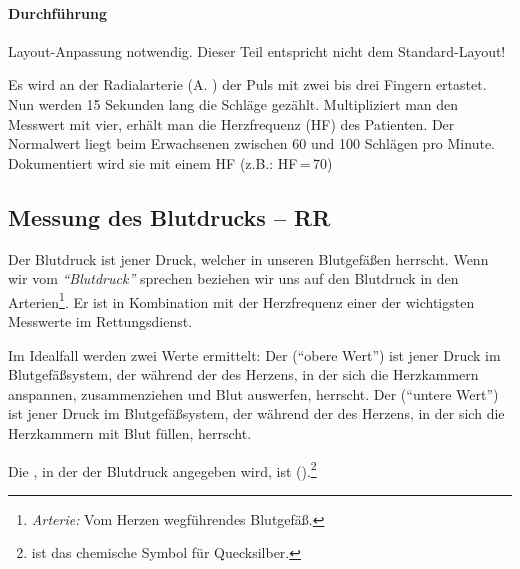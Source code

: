 \paragraph{Durchführung}
\begin{anfxwarning}[author=GABS]{Layout-Anpassung notwendig.}
   Dieser Teil entspricht nicht dem Standard-Layout!
\end{anfxwarning}

Es wird an der Radialarterie (A. ) der Puls mit
zwei bis drei Fingern ertastet. Nun werden 15 Sekunden lang
die Schläge gezählt. Multipliziert man den Messwert mit vier, erhält man  die Herzfrequenz (HF) des Patienten. Der Normalwert liegt beim Erwachsenen zwischen 60 und 100 Schlägen pro Minute.
Dokumentiert wird sie mit einem HF (z.B.: HF\,=\,70)

\subsection{Messung des Blutdrucks -- RR}
\label{topic:blutdruckmessung}

Der Blutdruck ist jener Druck, welcher in unseren Blutgefäßen
herrscht. Wenn wir vom \emph{"`Blutdruck"'} sprechen beziehen wir
uns auf den Blutdruck in den
Arterien\footnote{\emph{Arterie:} Vom Herzen wegführendes
Blutgefäß.}. Er ist in Kombination mit der Herzfrequenz
einer der wichtigsten Messwerte im
Rettungsdienst.

Im Idealfall werden zwei Werte ermittelt: Der
 ("`obere Wert"') ist jener Druck im
Blutgefäßsystem, der  während der  des Herzens, in der sich
die Herzkammern anspannen, zusammenziehen und Blut auswerfen, herrscht. Der
 ("`untere Wert"') ist jener Druck im
Blutgefäßsystem, der während der  des Herzens,
in der sich die Herzkammern mit
Blut füllen, herrscht. 

Die , in der der Blutdruck angegeben wird, ist
().\footnote{ ist
das chemische Symbol für Quecksilber.}

